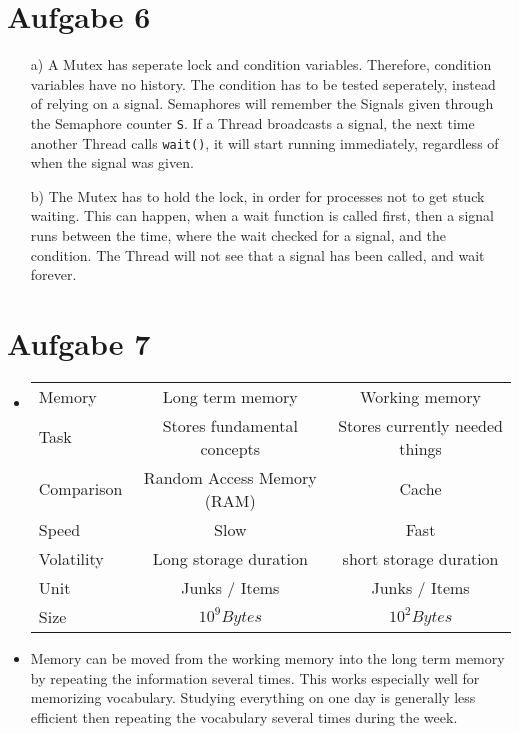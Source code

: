 \documentclass{article}
\begin{document}
\section*{Aufgabe 6}
\begin{itemize}
    \item[a)]
	A Mutex has seperate lock and condition variables. Therefore, condition
	variables have no history. The condition has to be tested seperately,
	instead of relying on a signal.
	Semaphores will remember the Signals given through the Semaphore counter
	\verb=S=. If a Thread broadcasts a signal, the next time another Thread
	calls \verb=wait()=, it will start running immediately, regardless
	of when the signal was given.
    \item[b)]
	The Mutex has to hold the lock, in order for processes not to get stuck
	waiting. This can happen, when a wait function is called first, then a
	signal runs between the time, where the wait checked for a signal, and
	the condition. The Thread will not see that a signal has been called,
	and wait forever.
\end{itemize}

\section*{Aufgabe 7}
\begin{itemize}
    \item 
\begin{table}[H]
    \centering
    \begin{tabular}{lcc}
	\toprule
	Memory & Long term memory & Working memory \\
	Task & Stores fundamental concepts & Stores currently needed things \\ \midrule
	Comparison & Random Access Memory (RAM) & Cache \\
	Speed & Slow & Fast \\
	Volatility & Long storage duration & short storage duration \\
	Unit & Junks / Items & Junks / Items \\
	Size & \( 10 ^{9} Bytes\) & \( 10 ^{2} Bytes \)
	\bottomrule
    \end{tabular}
\end{table}
\item Memory can be moved from the working memory into the long term memory by
    repeating the information several times. This works especially well for
    memorizing vocabulary. Studying everything on one day is generally less efficient
    then repeating the vocabulary several times during the week.
\end{itemize}
\end{document}
